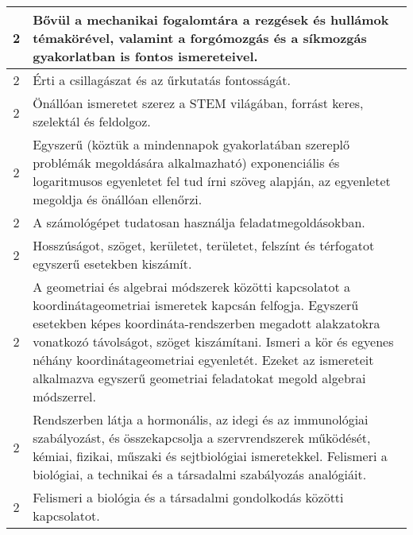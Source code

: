 \begin{longtable}{c | p{12cm} }
                                
                                          2 &  Bővül a mechanikai fogalomtára a rezgések és hullámok témakörével, valamint a forgómozgás és a síkmozgás gyakorlatban is fontos ismereteivel. \\ \hline
                                          2 &  Érti a csillagászat és az űrkutatás fontosságát. \\ \hline
                                          2 &  Önállóan ismeretet szerez a STEM világában, forrást keres, szelektál és feldolgoz. \\ \hline
                                          2 &  Egyszerű (köztük a mindennapok gyakorlatában szereplő problémák megoldására alkalmazható) exponenciális és logaritmusos egyenletet fel tud írni szöveg alapján, az egyenletet megoldja és önállóan ellenőrzi. \\ \hline
                                          2 &  A számológépet tudatosan használja feladatmegoldásokban. \\ \hline
                                          2 &  Hosszúságot, szöget, kerületet, területet, felszínt és térfogatot egyszerű esetekben kiszámít. \\ \hline
                                          2 &  A geometriai és algebrai módszerek közötti kapcsolatot a koordinátageometriai ismeretek kapcsán felfogja. Egyszerű esetekben képes koordináta-rendszerben megadott alakzatokra vonatkozó távolságot, szöget kiszámítani. Ismeri a kör és egyenes néhány koordinátageometriai egyenletét. Ezeket az ismereteit alkalmazva egyszerű geometriai feladatokat megold algebrai módszerrel. \\ \hline
                                          2 &  Rendszerben látja a hormonális, az idegi és az immunológiai szabályozást, és összekapcsolja a szervrendszerek működését, kémiai, fizikai, műszaki és sejtbiológiai ismeretekkel. Felismeri a biológiai, a technikai és a társadalmi szabályozás analógiáit. \\ \hline
                                          2 &  Felismeri a biológia és a társadalmi gondolkodás közötti kapcsolatot. \\ \hline
                                      

\end{longtable}
